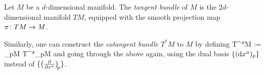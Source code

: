 \bd
Let $M$ be a $d$-dimensional manifold. The \emph{tangent bundle} of $M$ is the $2d$-dimensional manifold $TM$, equipped with the smooth projection map $\pi\colon TM \to M$.
\ed

Similarly, one can construct the \emph{cotangent bundle} $T^*M$ to $M$ by defining
\bse
T^*M := \bigcup_{p\in M} T^*_pM
\ese
and going through the above again, using the dual basis $\{(\mathrm{d} x^a)_p\}$ instead of $\{\left(\frac{\partial}{\partial {x}^{a}}\right)_{\negmedspace p}\}$.






















